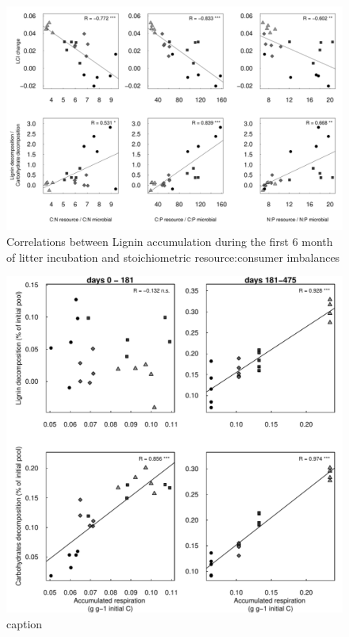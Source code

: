 \documentclass[10pt]{article}
\begin{document}
\newpage
\begin{figure}[h!]
\vspace*{2mm}
\begin{center}
\includegraphics{plosone-graphcorr}
\end{center}
\caption{Correlations between Lignin accumulation during the first 6 month of litter incubation and stoichiometric resource:consumer imbalances}
\label{fig:cor1}
\end{figure}

\newpage
\begin{figure}[h!]
\vspace*{2mm}
\begin{center}
\includegraphics{plosone-respcorr}
\end{center}
\caption{caption}
\label{fig:repcor}
\end{figure}
\end{document}
